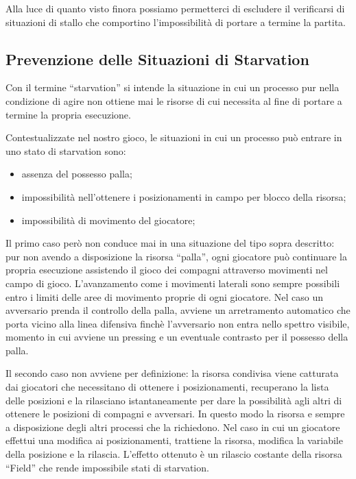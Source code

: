 \documentclass[aps,letterpaper,10pt]{article}
\begin{document}
Alla luce di quanto visto finora possiamo permetterci di escludere il verificarsi di situazioni di stallo che comportino
l'impossibilit\`a di portare a termine la partita.

\subsection{Prevenzione delle Situazioni di Starvation}
\label{starvation}

Con il termine ``starvation'' si intende la situazione in cui un processo pur nella condizione di agire non ottiene mai
le risorse di cui necessita al fine di portare a termine la propria esecuzione. \vspace{3mm}

Contestualizzate nel nostro gioco, le situazioni in cui un processo pu\`o entrare in uno stato di starvation sono:

\begin{itemize}
	\item assenza del possesso palla;
	\item impossibilit\`a nell'ottenere i posizionamenti in campo per blocco della risorsa;
	\item impossibilit\`a di movimento del giocatore;
\end{itemize}

Il primo caso per\`o non conduce mai in una situazione del tipo sopra descritto: pur non avendo a disposizione la
risorsa ``palla'', ogni giocatore pu\`o continuare la propria esecuzione assistendo il gioco dei compagni attraverso
movimenti nel campo di gioco. L'avanzamento come i movimenti laterali sono sempre possibili entro i limiti delle aree di
movimento proprie di ogni giocatore. Nel caso un avversario prenda il controllo della palla, avviene un arretramento
automatico che porta vicino alla linea difensiva finch\`e l'avversario non entra nello spettro visibile, momento in cui
avviene un pressing e un eventuale contrasto per il possesso della palla. \vspace{3mm}

Il secondo caso non avviene per definizione: la risorsa condivisa viene catturata dai giocatori che necessitano di
ottenere i posizionamenti, recuperano la lista delle posizioni e la rilasciano istantaneamente per dare la possibilit\`a
agli altri di ottenere le posizioni di compagni e avversari. In questo modo la risorsa e sempre a disposizione degli
altri processi che la richiedono. Nel caso in cui un giocatore effettui una modifica ai posizionamenti, trattiene la
risorsa, modifica la variabile della posizione e la rilascia. L'effetto ottenuto \`e un rilascio costante della risorsa
``Field'' che rende impossibile stati di starvation. \vspace{3mm}
\end{document}
